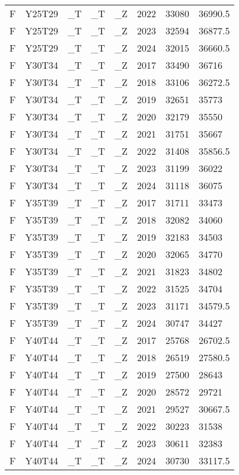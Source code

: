 \begin{longtable}[t]{llllllll}
F & Y25T29 & \_T & \_T & \_Z & 2022 & 33080 & 36990.5\\
F & Y25T29 & \_T & \_T & \_Z & 2023 & 32594 & 36877.5\\
\addlinespace
F & Y25T29 & \_T & \_T & \_Z & 2024 & 32015 & 36660.5\\
F & Y30T34 & \_T & \_T & \_Z & 2017 & 33490 & 36716\\
F & Y30T34 & \_T & \_T & \_Z & 2018 & 33106 & 36272.5\\
F & Y30T34 & \_T & \_T & \_Z & 2019 & 32651 & 35773\\
F & Y30T34 & \_T & \_T & \_Z & 2020 & 32179 & 35550\\
\addlinespace
F & Y30T34 & \_T & \_T & \_Z & 2021 & 31751 & 35667\\
F & Y30T34 & \_T & \_T & \_Z & 2022 & 31408 & 35856.5\\
F & Y30T34 & \_T & \_T & \_Z & 2023 & 31199 & 36022\\
F & Y30T34 & \_T & \_T & \_Z & 2024 & 31118 & 36075\\
F & Y35T39 & \_T & \_T & \_Z & 2017 & 31711 & 33473\\
\addlinespace
F & Y35T39 & \_T & \_T & \_Z & 2018 & 32082 & 34060\\
F & Y35T39 & \_T & \_T & \_Z & 2019 & 32183 & 34503\\
F & Y35T39 & \_T & \_T & \_Z & 2020 & 32065 & 34770\\
F & Y35T39 & \_T & \_T & \_Z & 2021 & 31823 & 34802\\
F & Y35T39 & \_T & \_T & \_Z & 2022 & 31525 & 34704\\
\addlinespace
F & Y35T39 & \_T & \_T & \_Z & 2023 & 31171 & 34579.5\\
F & Y35T39 & \_T & \_T & \_Z & 2024 & 30747 & 34427\\
F & Y40T44 & \_T & \_T & \_Z & 2017 & 25768 & 26702.5\\
F & Y40T44 & \_T & \_T & \_Z & 2018 & 26519 & 27580.5\\
F & Y40T44 & \_T & \_T & \_Z & 2019 & 27500 & 28643\\
\addlinespace
F & Y40T44 & \_T & \_T & \_Z & 2020 & 28572 & 29721\\
F & Y40T44 & \_T & \_T & \_Z & 2021 & 29527 & 30667.5\\
F & Y40T44 & \_T & \_T & \_Z & 2022 & 30223 & 31538\\
F & Y40T44 & \_T & \_T & \_Z & 2023 & 30611 & 32383\\
F & Y40T44 & \_T & \_T & \_Z & 2024 & 30730 & 33117.5\\

\end{longtable}
